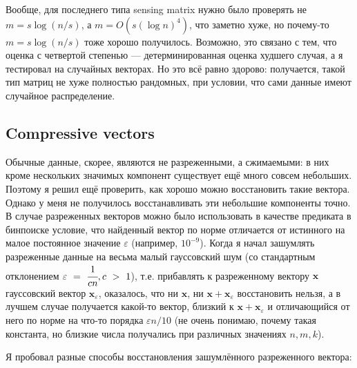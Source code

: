 \documentclass{article}
\def\*#1{\mathbf{#1}}
\begin{document}
Вообще, для последнего типа sensing matrix нужно было проверять не $m = s \log(n/s)$, а $m = O(s (\log n)^4)$, что заметно хуже, но почему-то $m = s \log(n/s)$ тоже хорошо получилось. Возможно, это связано с тем, что оценка с четвертой степенью --- детерминированная оценка худшего случая, а я тестировал на случайных векторах. Но это всё равно здорово: получается, такой тип матриц не хуже полностью рандомных, при условии, что сами данные имеют случайное распределение.


\subsection{Compressive vectors}

Обычные данные, скорее, являются не разреженными, а сжимаемыми: в них кроме нескольких значимых компонент существует ещё много совсем небольших. Поэтому я решил ещё проверить, как хорошо можно восстановить такие вектора. Однако у меня не получилось восстанавливать эти небольшие компоненты точно. В случае разреженных векторов можно было использовать в качестве предиката в бинпоиске условие, что найденный вектор по норме отличается от истинного на малое постоянное значение $\varepsilon$ (например, $10^{-9}$). Когда я начал зашумлять разреженные данные на весьма малый гауссовский шум (со стандартным отклонением $\varepsilon~=~\cfrac{1}{cn}, c~>~1$), т.е. прибавлять к разреженному вектору $\*x$ гауссовский вектор $\*x_\varepsilon$, оказалось, что ни $\*x$, ни $\*x + \*x_\varepsilon$ восстановить нельзя, а в лучшем случае получается какой-то вектор, близкий к $\*x + \*x_\varepsilon$ и отличающийся от него по норме на что-то порядка $\varepsilon n / 10$ (не очень понимаю, почему такая константа, но близкие числа получались при различных значениях $n, m, k$).

Я пробовал разные способы восстановления зашумлённого разреженного вектора:
\end{document}
